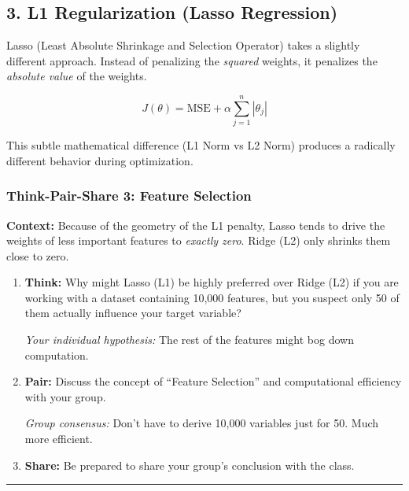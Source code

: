 \documentclass[11pt]{article}
\begin{document}
    \subsection{3. L1 Regularization (Lasso
Regression)}\label{l1-regularization-lasso-regression}

Lasso (Least Absolute Shrinkage and Selection Operator) takes a slightly
different approach. Instead of penalizing the \emph{squared} weights, it
penalizes the \emph{absolute value} of the weights.

\[J(\theta) = \text{MSE} + \alpha \sum_{j=1}^{n} |\theta_j|\]

This subtle mathematical difference (L1 Norm vs L2 Norm) produces a
radically different behavior during optimization.

\subsubsection{Think-Pair-Share 3: Feature
Selection}\label{think-pair-share-3-feature-selection}

\textbf{Context:} Because of the geometry of the L1 penalty, Lasso tends
to drive the weights of less important features to \emph{exactly zero}.
Ridge (L2) only shrinks them close to zero.

\begin{enumerate}
\def\labelenumi{\arabic{enumi}.}
\item
  \textbf{Think:} Why might Lasso (L1) be highly preferred over Ridge
  (L2) if you are working with a dataset containing 10,000 features, but
  you suspect only 50 of them actually influence your target variable?

  \emph{Your individual hypothesis:} The rest of the features might bog
  down computation.
\item
  \textbf{Pair:} Discuss the concept of ``Feature Selection'' and
  computational efficiency with your group.

  \emph{Group consensus:} Don't have to derive 10,000 variables just for
  50. Much more efficient.
\item
  \textbf{Share:} Be prepared to share your group's conclusion with the
  class.
\end{enumerate}

\begin{center}\rule{0.5\linewidth}{0.5pt}\end{center}
\end{document}

